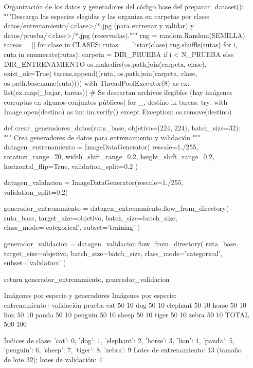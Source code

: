 \documentclass[11pt,letterpaper]{article}
\begin{document}
\begin{codigo}[label=cod:datos]{Organización de los datos y generadores del código base}
def preparar_dataset():
    """Descarga las especies elegidas y las organiza en carpetas por clase:
    datos/entrenamiento/<clase>/*.jpg (para entrenar y validar) y datos/prueba/<clase>/*.jpg (reservadas)."""
    rng = random.Random(SEMILLA)
    tareas = []
    for clase in CLASES:
        rutas = _listar(clase)
        rng.shuffle(rutas)
        for i, ruta in enumerate(rutas):
            carpeta = DIR_PRUEBA if i < N_PRUEBA else DIR_ENTRENAMIENTO
            os.makedirs(os.path.join(carpeta, clase), exist_ok=True)
            tareas.append((ruta, os.path.join(carpeta, clase, os.path.basename(ruta))))
    with ThreadPoolExecutor(8) as ex:
        list(ex.map(_bajar, tareas))
    # Se descartan archivos ilegibles (hay imágenes corruptas en algunos conjuntos públicos)
    for _, destino in tareas:
        try:
            with Image.open(destino) as im:
                im.verify()
        except Exception:
            os.remove(destino)

def crear_generadores_datos(ruta_base, objetivo=(224, 224), batch_size=32):
    """
    Crea generadores de datos para entrenamiento y validación
    """
    datagen_entrenamiento = ImageDataGenerator(
        rescale=1./255,
        rotation_range=20,
        width_shift_range=0.2,
        height_shift_range=0.2,
        horizontal_flip=True,
        validation_split=0.2
    )

    datagen_validacion = ImageDataGenerator(rescale=1./255, validation_split=0.2)

    generador_entrenamiento = datagen_entrenamiento.flow_from_directory(
        ruta_base,
        target_size=objetivo,
        batch_size=batch_size,
        class_mode='categorical',
        subset='training'
    )

    generador_validacion = datagen_validacion.flow_from_directory(
        ruta_base,
        target_size=objetivo,
        batch_size=batch_size,
        class_mode='categorical',
        subset='validation'
    )

    return generador_entrenamiento, generador_validacion
\end{codigo}

\begin{consola}[label=out:datos]{Imágenes por especie y generadores}
Imágenes por especie:
          entrenamiento+validación  prueba
cat                             50      10
dog                             50      10
elephant                        50      10
horse                           50      10
lion                            50      10
panda                           50      10
penguin                         50      10
sheep                           50      10
tiger                           50      10
zebra                           50      10
TOTAL                          500     100

Índices de clase: {'cat': 0, 'dog': 1, 'elephant': 2, 'horse': 3, 'lion': 4, 'panda': 5, 'penguin': 6, 'sheep': 7, 'tiger': 8, 'zebra': 9}
Lotes de entrenamiento: 13 (tamaño de lote 32); lotes de validación: 4
\end{consola}
\end{document}
